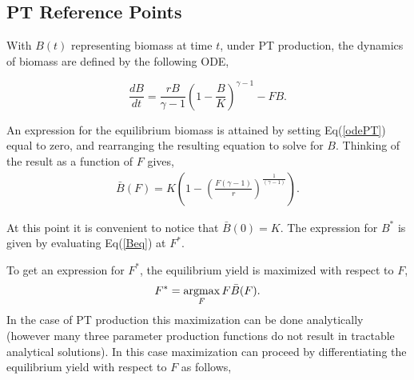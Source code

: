 \documentclass[12pt]{article}
\newcommand{\argmax}{\operatornamewithlimits{argmax}}
\begin{document}


%
\subsection{PT Reference Points}\label{ptRef}

%
With $B(t)$ representing biomass at time $t$, under PT production, the 
dynamics of biomass are defined by the following ODE,
 
\begin{equation}
\frac{dB}{dt} = \frac{r B}{\gamma-1} \left(1-\frac{B}{K}\right)^{\gamma-1} - FB. \label{odePT}
\end{equation}

An expression for the equilibrium biomass is attained by setting Eq(\ref{odePT}) 
equal to zero, and rearranging the resulting equation to solve for $B$. 
Thinking of the result as a function of $F$ gives, 
\begin{align}
\bar B(F) = K\left(1-\left(\frac{F(\gamma-1)}{r}\right)^{\frac{1}{(\gamma-1)}}\right). \label{Beq}
\end{align}

At this point it is convenient to notice that $\bar B(0)=K$. The expression for $B^*$ is given by evaluating Eq(\ref{Beq}) at $F^*$.

%
To get an expression for $F^*$, the equilibrium yield is maximized with respect to $F$,
\begin{equation}
F^* = \argmax_F F\bar B(F).
\end{equation}
%
In the case of PT production this maximization can be done analytically (however 
many three parameter production functions do not result in tractable analytical 
solutions). In this case maximization can proceed by differentiating the 
equilibrium yield with respect to $F$ as follows,
\end{document}
